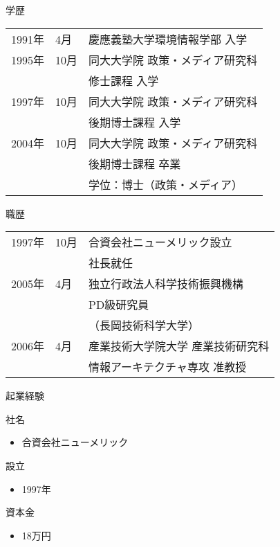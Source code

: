 \documentclass[t]{beamer}
\begin{document}
\begin{frame}[label=sec-1-3]{学歴}
\begin{center}
\begin{tabular}{lll}
1991年 & 4月 & 慶應義塾大学環境情報学部 入学\\
1995年 & \alert{10月} & 同大大学院 政策・メディア研究科\\
 &  & 修士課程 入学\\
1997年 & 10月 & 同大大学院 政策・メディア研究科\\
 &  & 後期博士課程 入学\\
2004年 & 10月 & 同大大学院 政策・メディア研究科\\
 &  & 後期博士課程 卒業\\
 &  & 学位：博士（政策・メディア）\\
\end{tabular}
\end{center}
\end{frame}
\begin{frame}[label=sec-1-4]{職歴}
\begin{center}
\begin{tabular}{lll}
1997年 & 10月 & 合資会社ニューメリック設立\\
 &  & \alert{社長就任}\\
2005年 & 4月 & 独立行政法人科学技術振興機構\\
 &  & PD級研究員\\
 &  & （長岡技術科学大学）\\
2006年 & 4月 & 産業技術大学院大学 産業技術研究科\\
 &  & 情報アーキテクチャ専攻 准教授\\
\end{tabular}
\end{center}
\end{frame}

\begin{frame}[label=sec-1-5]{起業経験}
\begin{block}{社名}
\begin{itemize}
\item 合資会社ニューメリック
\end{itemize}
\end{block}

\begin{block}{設立}
\begin{itemize}
\item 1997年
\end{itemize}
\end{block}

\begin{block}{資本金}
\begin{itemize}
\item \alert{18万円}
\end{itemize}
\end{block}
\end{frame}
\end{document}
